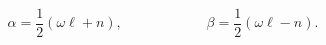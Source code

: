 \begin{equation}
\alpha=\frac{1}{2}\left( \omega \ell+n\right),\,\,\,\,\,\,\,\,\,\,\,\,\,\,\,\,\,\,\,\,\,\,\,\,\,\,\,\,\,\,\,\,\,\,\,\,\beta  =
\frac{1}{2}\left(
\omega
\ell-n\right).
\end{equation}

